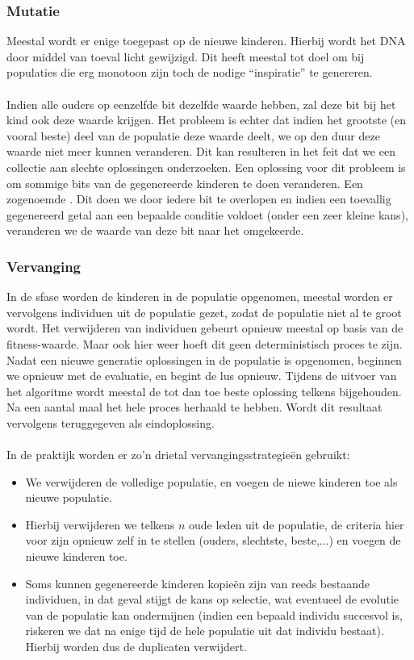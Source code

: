 \subsubsection{Mutatie}Meestal wordt er enige  toegepast op de nieuwe kinderen. Hierbij wordt het DNA door middel van toeval licht gewijzigd. Dit heeft meestal tot doel om bij populaties die erg monotoon zijn toch de nodige ``inspiratie'' te genereren.
\paragraph{}Indien alle ouders op eenzelfde bit dezelfde waarde hebben, zal deze bit bij het kind ook deze waarde krijgen. Het probleem is echter dat indien het grootste (en vooral beste) deel van de populatie deze waarde deelt, we op den duur deze waarde niet meer kunnen veranderen. Dit kan resulteren in het feit dat we een collectie aan slechte oplossingen onderzoeken. Een oplossing voor dit probleem is om sommige bits van de gegenereerde kinderen te doen veranderen. Een zogenoemde . Dit doen we door iedere bit te overlopen en indien een toevallig gegenereerd getal aan een bepaalde conditie voldoet (onder een zeer kleine kans), veranderen we de waarde van deze bit naar het omgekeerde.
\subsubsection{Vervanging}In de sfase worden de kinderen in de populatie opgenomen, meestal worden er vervolgens individuen uit de populatie gezet, zodat de populatie niet al te groot wordt. Het verwijderen van individuen gebeurt opnieuw meestal op basis van de fitness-waarde. Maar ook hier weer hoeft dit geen deterministisch proces te zijn. Nadat een nieuwe generatie oplossingen in de populatie is opgenomen, beginnen we opnieuw met de evaluatie, en begint de lus opnieuw. Tijdens de uitvoer van het algoritme wordt meestal de tot dan toe beste oplossing telkens bijgehouden. Na een aantal maal het hele proces herhaald te hebben. Wordt dit resultaat vervolgens teruggegeven als eindoplossing.
\paragraph{}In de praktijk worden er zo'n drietal vervangingsstrategie\"en gebruikt:
\begin{itemize}
 \item {} We verwijderen de volledige populatie, en voegen de niewe kinderen toe als nieuwe populatie.
 \item {} Hierbij verwijderen we telkens $n$ oude leden uit de populatie, de criteria hier voor zijn opnieuw zelf in te stellen (ouders, slechtste, beste,...) en voegen de nieuwe kinderen toe.
 \item {} Soms kunnen gegenereerde kinderen kopie\"en zijn van reeds bestaande individuen, in dat geval stijgt de kans op selectie, wat eventueel de evolutie van de populatie kan ondermijnen (indien een bepaald individu succesvol is, riskeren we dat na enige tijd de hele populatie uit dat individu bestaat). Hierbij worden dus de duplicaten verwijdert.
\end{itemize}
